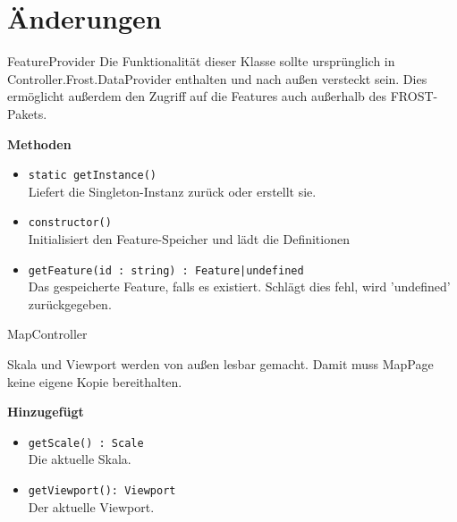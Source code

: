 \section{Änderungen}
\begin{Change}{FeatureProvider}
    Die Funktionalität dieser Klasse sollte ursprünglich in 
    Controller.Frost.DataProvider enthalten und nach außen versteckt sein.
    Dies ermöglicht außerdem den 
    Zugriff auf die Features auch außerhalb des FROST-Pakets.
    
    \bigskip
    \textbf{Methoden}
    \begin{itemize}
        \item \texttt{static getInstance()}
        \\ Liefert die Singleton-Instanz zurück oder erstellt sie.
        \item \texttt{constructor()}
        \\ Initialisiert den Feature-Speicher und lädt die Definitionen
        \item \texttt{getFeature(id : string) : Feature|undefined}
        \\ Das gespeicherte Feature, falls es existiert.
        Schlägt dies fehl, wird 'undefined' zurückgegeben.
    \end{itemize}
\end{Change}

\begin{Change}{MapController}
    
    Skala und Viewport werden von außen lesbar gemacht.
    Damit muss MapPage keine eigene Kopie bereithalten.

    \bigskip
    \textbf{Hinzugefügt}
    \begin{itemize}
        \item \texttt{getScale() : Scale}
        \\ Die aktuelle Skala.
        \item \texttt{getViewport(): Viewport}
        \\ Der aktuelle Viewport.
    \end{itemize}

\end{Change}

